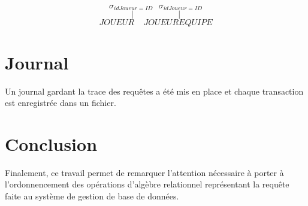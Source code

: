\documentclass[11pt,french]{article}
\begin{document}
        \vspace{1.8cm}

        $$\sigma_{idJoueur=ID} \ \ \ \sigma_{idJoueur=ID}$$
        $$\Bigg | \ \ \ \ \ \ \ \ \ \ \ \ \ \ \ \ \ \ \ \ \ \ \ \ \Bigg |$$
        $$JOUEUR \ \ \ \ \ JOUEUREQUIPE$$
    \section{Journal} %
    \label{sec:Journal}
        Un journal gardant la trace des requêtes a été mis en place et chaque transaction est enregistrée dans un fichier.
    \section*{Conclusion} %
    \label{sec:Conclusion}
        Finalement, ce travail permet de remarquer l'attention nécessaire à porter à l'ordonnencement des opérations d'algèbre relationnel
        représentant la requête faite au système de gestion de base de données.
\end{document}
